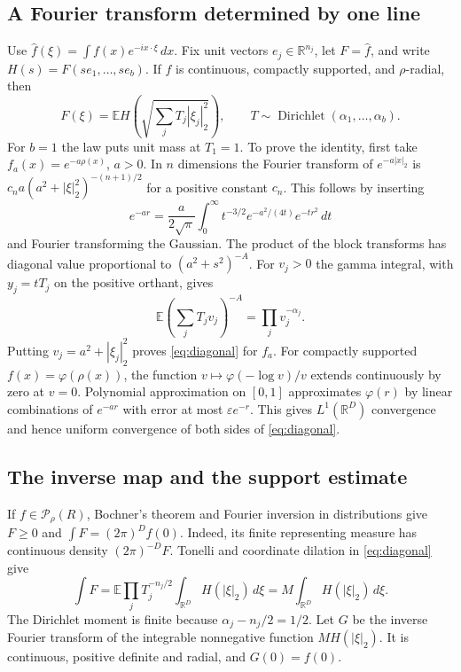 \documentclass[11pt,a4paper]{article}
\numberwithin{equation}{section}
\newcommand{\R}{\mathbb R}\newcommand{\E}{\mathbb E}\newcommand{\norm}[1]{\left\lVert #1\right\rVert}
\begin{document}
\subsection{A Fourier transform determined by one line}
Use $\widehat f(\xi)=\int f(x)e^{-ix\cdot\xi}\,dx$. Fix unit vectors $e_j\in\mathbb R^{n_j}$, let $F=\widehat f$, and write $H(s)=F(se_1,\ldots,se_b)$. If $f$ is continuous, compactly supported, and $\rho$-radial, then
\begin{equation}\label{eq:diagonal}
 F(\xi)=\E H\!\left(\sqrt{\sum_j T_j|\xi_j|_2^2}\right),\qquad
 T\sim\operatorname{Dirichlet}(\alpha_1,\ldots,\alpha_b).
\end{equation}
For $b=1$ the law puts unit mass at $T_1=1$. To prove the identity, first take $f_a(x)=e^{-a\rho(x)}$, $a>0$. In $n$ dimensions the Fourier transform of $e^{-a|x|_2}$ is $c_n a(a^2+|\xi|_2^2)^{-(n+1)/2}$ for a positive constant $c_n$. This follows by inserting
\[
 e^{-ar}=\frac{a}{2\sqrt\pi}\int_0^\infty t^{-3/2}e^{-a^2/(4t)}e^{-tr^2}\,dt
\]
and Fourier transforming the Gaussian. The product of the block transforms has diagonal value proportional to $(a^2+s^2)^{-A}$. For $v_j>0$ the gamma integral, with $y_j=t T_j$ on the positive orthant, gives
\[
 \E\left(\sum_j T_j v_j\right)^{-A}=\prod_j v_j^{-\alpha_j} .
\]
Putting $v_j=a^2+|\xi_j|_2^2$ proves \eqref{eq:diagonal} for $f_a$. For compactly supported $f(x)=\varphi(\rho(x))$, the function $v\mapsto\varphi(-\log v)/v$ extends continuously by zero at $v=0$. Polynomial approximation on $[0,1]$ approximates $\varphi(r)$ by linear combinations of $e^{-ar}$ with error at most $\varepsilon e^{-r}$. This gives $L^1(\R^D)$ convergence and hence uniform convergence of both sides of \eqref{eq:diagonal}.

\subsection{The inverse map and the support estimate}
If $f\in\mathcal P_\rho(R)$, Bochner's theorem and Fourier inversion in distributions give $F\ge0$ and $\int F=(2\pi)^D f(0)$. Indeed, its finite representing measure has continuous density $(2\pi)^{-D}F$. Tonelli and coordinate dilation in \eqref{eq:diagonal} give
\begin{equation}\label{eq:moment}
 \int F=\E\prod_j T_j^{-n_j/2}\int_{\R^D} H(|\xi|_2)\,d\xi
       = M\int_{\R^D} H(|\xi|_2)\,d\xi .
\end{equation}
The Dirichlet moment is finite because $\alpha_j-n_j/2=1/2$. Let $G$ be the inverse Fourier transform of the integrable nonnegative function $M H(|\xi|_2)$. It is continuous, positive definite and radial, and $G(0)=f(0)$.
\end{document}
